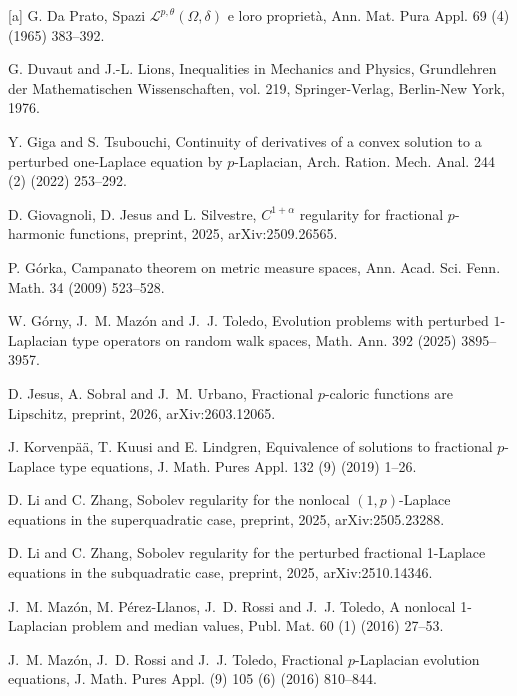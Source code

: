\documentclass[reqno,10pt]{amsart}
\numberwithin{equation}{section}
\begin{document}
\begin{thebibliography}{[a]}
		 G. Da Prato, Spazi $\mathcal{L}^{p,\theta}(\Omega,\delta)$ e loro propriet\`a,  Ann. Mat. Pura Appl. 69 (4) (1965) 383--392.
		
		
		 G. Duvaut and J.-L. Lions, Inequalities in Mechanics and Physics, Grundlehren der Mathematischen Wissenschaften, vol. 219, Springer-Verlag, Berlin-New York, 1976.
		
		  Y. Giga and S. Tsubouchi, Continuity of derivatives of a convex solution to a perturbed one-Laplace equation by $p$-Laplacian, Arch. Ration. Mech. Anal. 244 (2) (2022) 253--292.
		
		 D. Giovagnoli, D. Jesus and L. Silvestre, $C^{1+\alpha}$ regularity for fractional $p$-harmonic functions, preprint, 2025, arXiv:2509.26565.
		
		 P. G\'orka, Campanato theorem on metric measure spaces, Ann. Acad. Sci. Fenn. Math. 34 (2009) 523--528.
		
		 W. G\'{o}rny, J.~M. Maz\'on and J.~J. Toledo, Evolution problems with perturbed $1$-Laplacian type operators on random walk spaces, Math. Ann. 392 (2025) 3895--3957.
		
		 D. Jesus, A. Sobral and J.~M. Urbano, Fractional $p$-caloric functions are Lipschitz, preprint, 2026, arXiv:2603.12065.
		
		 J. Korvenp\"{a}\"{a}, T. Kuusi and E. Lindgren, Equivalence of solutions to fractional $p$-Laplace type equations, J. Math. Pures Appl. 132 (9) (2019) 1--26.

		 D. Li and C. Zhang, Sobolev regularity for the nonlocal $(1, p)$-Laplace equations in the superquadratic case, preprint, 2025, arXiv:2505.23288.
		
		 D. Li and C. Zhang, Sobolev regularity for the perturbed fractional 1-Laplace equations in the subquadratic case, preprint, 2025, arXiv:2510.14346.
		
		 J.~M. Maz\'on, M. P\'erez-Llanos, J.~D. Rossi and J.~J. Toledo, A nonlocal 1-Laplacian problem and median values, Publ. Mat. 60 (1) (2016) 27--53.
		
		 J.~M. Maz\'on, J.~D. Rossi and J.~J. Toledo, Fractional $p$-Laplacian evolution equations, J. Math. Pures Appl. (9) 105 (6) (2016) 810--844.
		

\end{thebibliography}
\end{document}
